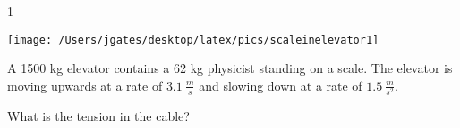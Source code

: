 
\AddToShipoutPicture*{\BackgroundPic}

\addtocounter {ProbNum} {1}

\begin{floatingfigure}[r]{.2\textwidth}
\texttt{[image: /Users/jgates/desktop/latex/pics/scaleinelevator1]}
\end{floatingfigure}
 
{\bf \Large{}} A 1500 kg elevator contains a 62 kg physicist standing on a scale. The elevator is moving upwards at a rate of ${3.1~\tfrac{m}{s}}$ and slowing down at a rate of ${1.5~\tfrac{m}{s^2}}$.

\bigskip
What is the tension in the cable?




\vfill
\newpage
